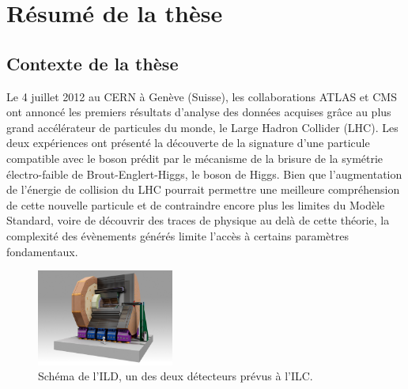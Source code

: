 \chapter{Résumé de la thèse}

  \section{Contexte de la thèse}

  Le 4 juillet 2012 au CERN à Genève (Suisse), les collaborations ATLAS et CMS ont annoncé les premiers résultats d'analyse des données acquises grâce au plus grand accélérateur de particules du monde, le Large Hadron Collider (LHC)\cite{Aad2012}\cite{Chatrchyan2012}. 
  Les deux expériences ont présenté la découverte de la signature d'une particule compatible avec le boson prédit par le mécanisme de la brisure de la symétrie électro-faible de Brout-Englert-Higgs, le boson de Higgs.
  Bien que l'augmentation de l'énergie de collision du LHC pourrait permettre une meilleure compréhension de cette nouvelle particule et de contraindre encore plus les limites du Modèle Standard, voire de découvrir des traces de physique au delà de cette théorie, la complexité des évènements générés limite l'accès à certains paramètres fondamentaux.
  
  \begin{figure}[!h]
    \centering
    \includegraphics[width = 0.4\textwidth]{Pictures/ILC/ILD.jpg}
    \caption{Schéma de l'ILD, un des deux détecteurs prévus à l'ILC.}
    \label{fig:ILD}
  \end{figure}
 
